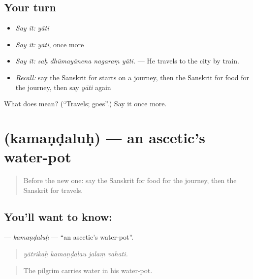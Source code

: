 \subsection*{Your turn}
\begin{itemize}
\raggedright
  \item \emph{Say it:} \emph{yāti}
  \item \emph{Say it:} \emph{yāti}, once more
  \item \emph{Say it:} \emph{saḥ dhūmayānena nagaraṃ yāti.} — He travels to the city by train.
  \item \emph{Recall:} say the Sanskrit for starts on a journey, then the Sanskrit for food for the journey, then say \emph{yāti} again
\end{itemize}

\begin{tcolorbox}[breakable,colback=teal!4,colframe=teal!35!black,title={Before you move on}]
What does  mean? (\textquotedblleft{}Travels; goes\textquotedblright{}.) Say it once more.
\end{tcolorbox}
\section[\texorpdfstring{\sk{कमण्डलुः} (kamaṇḍaluḥ)}{कमण्डलुः (kamaṇḍaluḥ)}]{ (kamaṇḍaluḥ) — an ascetic's water-pot}

\label{lesson:SA-C394-kamandaluh}



\begin{quote}
Before the new one: say the Sanskrit for food for the journey, then the Sanskrit for travels.
\end{quote}

\subsection*{You'll want to know: }
\textbf{} — \emph{kamaṇḍaluḥ} — \textquotedblleft{}an ascetic's water-pot\textquotedblright{}.

\begin{quote}
   
\end{quote}

\begin{quote}
\emph{yātrikaḥ kamaṇḍalau jalaṃ vahati.}
\end{quote}

\begin{quote}
The pilgrim carries water in his water-pot.
\end{quote}

